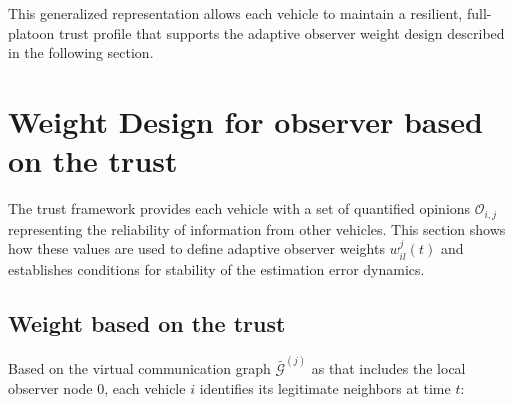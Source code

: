 \documentclass{ifacconf}
\def\G{\mathcal{G}} %
\def\O{\mathcal{O}} %
\begin{document}
This generalized representation allows each vehicle to maintain a resilient, full-platoon trust profile that supports the adaptive observer weight design described in the following section.

\section{Weight Design for observer based on the trust}\label{sec_Weigth_Design}
The trust framework provides each vehicle with a set of quantified opinions $\O_{i,j}$ representing the reliability of information from other vehicles.
This section shows how these values are used to define adaptive observer weights $w_{il}^{j}(t)$ and establishes conditions for stability of the estimation error dynamics.

\subsection{Weight based on the trust}
Based on the virtual communication graph $\bar{\G}^{{(j)}}$ as that includes the local observer node 0, each vehicle $i$ identifies its legitimate neighbors at time $t$: 


\end{document}
